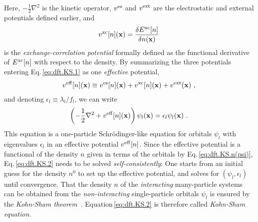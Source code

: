Here, $-\frac{1}{2} \nabla^2$ is the kinetic operator, $v^{\rm es}$ and $v^{\rm ext}$ are the electrostatic and external potentials defined earlier, and
\begin{align}
	v^{\rm xc} [n] ({\bf x})
		= \frac{\delta E^{\rm xc}[n]}{\delta n ({\bf x})}
	\label{eq:dft.vxc}
\end{align}
is the \emph{exchange-correlation potential} formally defined as the functional derivative of $E^{\rm xc} [n]$ with respect to the density. By summarizing the three potentials entering Eq.\,\eqref{eq:dft.KS.1} as one \emph{effective} potential,
\begin{align}
	v^{\rm eff} [n] ({\bf x})
	\equiv
		v^{\rm es} [n] ({\bf x})
		+ v^{\rm xc} [n] ({\bf x})
		+ v^{\rm ext}  ({\bf x})~,
	\label{eq:dft.KS.veff}
\end{align}
 and denoting $\epsilon_l \equiv \lambda_l / f_l$, we can write
\begin{align}
	\left(
		-\frac{1}{2} \nabla^2 
		+ v^{\rm eff} [n] ({\bf x})
	\right) \psi_l ({\bf x})
	= \epsilon_l \psi_l ({\bf x})~.
\label{eq:dft.KS.2}
\end{align}
This equation is a one-particle Schr\"odinger-like equation for orbitals $\psi_l$ with eigenvalues $\epsilon_l$ in an effective potential $v^{\rm eff}[n]$. Since the effective potential is a functional of the density $n$ given in terms of the orbitals by Eq.\,\eqref{eq:dft.KS.n(psi)}, Eq.\,\eqref{eq:dft.KS.2} needs to be solved \emph{self-consistently}: One starts from an initial guess for the density $n^0$ to set up the effective potential, and solves for $(\psi_l, \epsilon_l)$ until convergence. That the density $n$ of the \emph{interacting} many-particle systems can be obtained from the \emph{non-interacting} single-particle orbitals $\psi_l$ is ensured by the \emph{Kohn-Sham theorem}~\cite{Kohn1965}. Equation\,\eqref{eq:dft.KS.2} is therefore called \emph{Kohn-Sham equation}.

